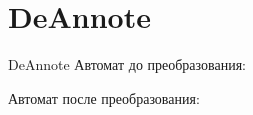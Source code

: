 \section{DeAnnote}
\begin{frame}{DeAnnote}
	Автомат до преобразования:


	Автомат после преобразования:


\end{frame}
